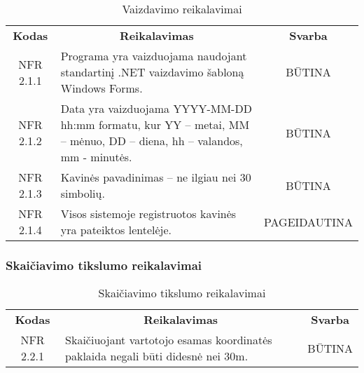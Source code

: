 \documentclass{VUMIFPSkursinis}
\begin{document}
\begin{center}
	\begin{table}[H]
	\begin{tabular}{|p{2cm}|p{}|p{}|}
	\hline
	    \rowcolor{lightgray}
		\multicolumn{3}{|c|}{Vaizdavimo reikalavimai}\\
		
	\hline
		\multicolumn{1}{|c|}{{\bfseries Kodas}}&
		\multicolumn{1}{|c|}{{\bfseries Reikalavimas}}&
		\multicolumn{1}{|c|}{{\bfseries Svarba}}\\
	\hline 	
		\multicolumn{1}{|c|}{NFR 2.1.1}&
		{Programa yra vaizduojama naudojant standartinį .NET vaizdavimo šabloną Windows Forms.}&
		\multicolumn{1}{|c|}{BŪTINA}\\	
	
	\hline 	
		\multicolumn{1}{|c|}{NFR 2.1.2}&
		{Data yra vaizduojama YYYY-MM-DD hh:mm formatu, kur YY – metai, MM – mėnuo, DD – diena, hh – valandos, mm - minutės.}&
		\multicolumn{1}{|c|}{BŪTINA}\\	
	
	\hline 	
		\multicolumn{1}{|c|}{NFR 2.1.3}&
		{Kavinės pavadinimas – ne ilgiau nei 30 simbolių.}&
		\multicolumn{1}{|c|}{BŪTINA}\\	
	
	\hline  	
		\multicolumn{1}{|c|}{NFR 2.1.4}&
		{Visos sistemoje registruotos kavinės yra pateiktos lentelėje.}&
		\multicolumn{1}{|p{1.5cm}|}{PAGEIDAUTINA}\\		
	
	\hline 	 	 	
	\end{tabular}
	\caption{Vaizdavimo reikalavimai}
	\label{table:Vaizdavimoreikalavimai}
	\end{table}

\end{center}

\subsubsection{Skaičiavimo tikslumo reikalavimai}

\begin{center}
	\begin{table}[H]
	\begin{tabular}{|p{2cm}|p{}|p{}|}
	\hline
	    \rowcolor{lightgray}
		\multicolumn{3}{|c|}{Skaičiavimo tikslumo reikalavimai}\\
		
	\hline
		\multicolumn{1}{|c|}{{\bfseries Kodas}}&
		\multicolumn{1}{|c|}{{\bfseries Reikalavimas}}&
		\multicolumn{1}{|c|}{{\bfseries Svarba}}\\
	\hline 	
		\multicolumn{1}{|c|}{NFR 2.2.1}&
		{Skaičiuojant vartotojo esamas koordinatės paklaida negali būti didesnė nei 30m.}&
		\multicolumn{1}{|c|}{BŪTINA}\\	
	\hline 	 	 	
	\end{tabular}
	\caption{Skaičiavimo tikslumo reikalavimai}
	\label{table:Skaičiavimotikslumoreikalavimai}
	\end{table}

\end{center}
\end{document}
